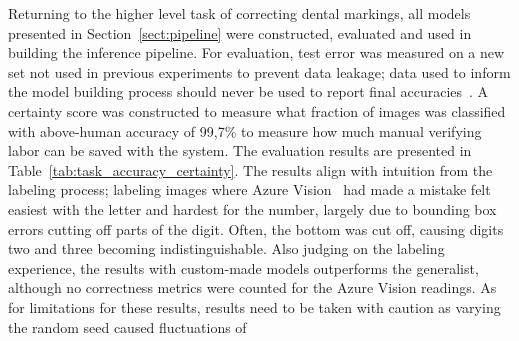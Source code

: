 \documentclass[english,twoside,openright]{UH_DS_MSc}
\begin{document}
Returning to the higher level task of correcting dental markings, all models presented in Section~\ref{sect:pipeline} were constructed, evaluated and used 
in building the inference pipeline. For evaluation, test error was measured on a new set not used in previous experiments 
to prevent data leakage; data used to inform the model building process should never be used to report final accuracies~\cite{engbook}.
A certainty score was constructed to measure what fraction of images was classified with above-human accuracy of 99,7\% to measure 
how much manual verifying labor can be saved with the system. The evaluation results are presented in Table~\ref{tab:task_accuracy_certainty}.
The results align with intuition from the labeling process; labeling images 
where Azure Vision~\cite{azurevision} had made a mistake felt easiest 
with the letter and hardest for the number, largely due to bounding box errors 
cutting off parts of the digit. Often, the bottom was cut off, causing digits two and three becoming indistinguishable. Also judging on the labeling experience,
the results with custom-made models outperforms the generalist, although no 
correctness metrics were counted for the Azure Vision readings. 
As for limitations for these results, results need to 
be taken with caution as varying the random seed caused fluctuations of 
\end{document}
